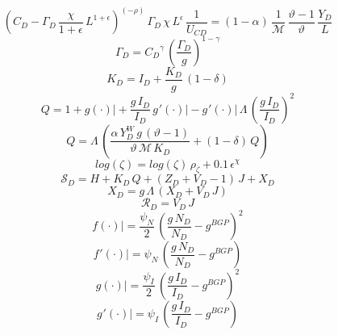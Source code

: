 \documentclass[10pt,a4paper]{article}
\begin{document}
\begin{dmath}
\left({C_D}-{\Gamma_D}\, \frac{\chi}{1+\epsilon}\, {L}^{1+\epsilon}\right)^{\left(-\rho\right)}\, {\Gamma_D}\, \chi\, {L}^{\epsilon}\, \frac{1}{{U_{CD}}}=\left(1-\alpha\right)\, \frac{1}{\mathcal{M}}\, \frac{\vartheta-1}{\vartheta}\, \frac{{Y_D}}{{L}}
\end{dmath}
\begin{dmath}
{\Gamma_D}={C_D}^{\gamma}\, \left(\frac{{\Gamma_D}}{{g}}\right)^{1-\gamma}
\end{dmath}
\begin{dmath}
{K_D}={I_D}+\frac{{K_D}}{{g}}\, \left(1-\delta\right)
\end{dmath}
\begin{dmath}
{Q}=1+{\left.       g\left( \cdot \right)            \right|}+\frac{{g}\, {I_D}}{{I_D}}\, {\left.       g^‎{\prime}\left( \cdot \right)   \right|}-{\left.       g^‎{\prime}\left( \cdot \right)   \right|}\, {\Lambda}\, \left(\frac{{g}\, {I_D}}{{I_D}}\right)^{2}
\end{dmath}
\begin{dmath}
{Q}={\Lambda}\, \left(\frac{\alpha\, {Y^W_D}\, {g}\, \left(\vartheta-1\right)}{\vartheta\, \mathcal{M}\, {K_D}}+\left(1-\delta\right)\, {Q}\right)
\end{dmath}
\begin{dmath}
log\left({\zeta}\right)=log\left({\zeta}\right)\, {\rho}_{\zeta}+0.1\, {\epsilon}^{\chi}
\end{dmath}
\begin{dmath}
{\mathcal{S}_{D}}={H}+{K_D}\, {Q}+\left({Z_D}+{V_D}-1\right)\, {J}+{X_D}
\end{dmath}
\begin{dmath}
{X_D}={g}\, {\Lambda}\, \left({X_D}+{V_D}\, {J}\right)
\end{dmath}
\begin{dmath}
{\mathcal{R}_{D}}={V_D}\, {J}
\end{dmath}
\begin{dmath}
{\left.       f\left( \cdot \right)            \right|}=\frac{\psi_N}{2}\, \left(\frac{{g}\, {N_D}}{{N_D}}-g^{BGP}\right)^{2}
\end{dmath}
\begin{dmath}
{\left.       f^‎{\prime}\left( \cdot \right)   \right|}=\psi_N\, \left(\frac{{g}\, {N_D}}{{N_D}}-g^{BGP}\right)
\end{dmath}
\begin{dmath}
{\left.       g\left( \cdot \right)            \right|}=\frac{\psi_I}{2}\, \left(\frac{{g}\, {I_D}}{{I_D}}-g^{BGP}\right)^{2}
\end{dmath}
\begin{dmath}
{\left.       g^‎{\prime}\left( \cdot \right)   \right|}=\psi_I\, \left(\frac{{g}\, {I_D}}{{I_D}}-g^{BGP}\right)
\end{dmath}
\end{document}
